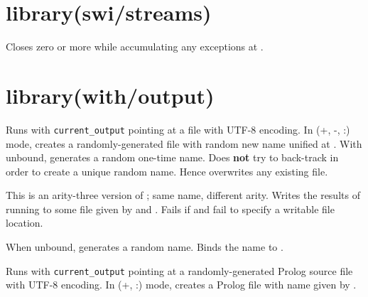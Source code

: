 \chapter{library(swi/streams)}\label{sec:streams}

\begin{description}
Closes zero or more  while accumulating any exceptions at
.
\end{description}

\chapter{library(with/output)}\label{sec:output}

\begin{description}
Runs  with \verb$current_output$ pointing at a file with UTF-8
encoding. In (+, -, :) mode, creates a randomly-generated file with
random new name unified at . With  unbound, generates a
random one-time name. Does \textbf{not} try to back-track in order to
create a unique random name. Hence overwrites any existing file.

This is an arity-three version of ; same name,
different arity. Writes the results of running  to some file
given by  and . Fails if  and  fail to
specify a writable file location.

When  unbound, generates a random name. Binds the name to .

Runs  with \verb$current_output$ pointing at a randomly-generated
Prolog source file with UTF-8 encoding. In (+, :) mode, creates a
Prolog file with name given by .
\end{description}

